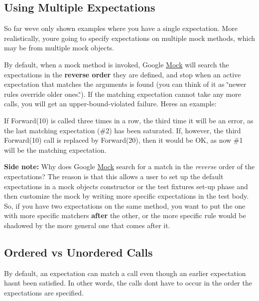 \subsection*{Using Multiple Expectations}

So far we\textquotesingle{}ve only shown examples where you have a single expectation. More realistically, you\textquotesingle{}re going to specify expectations on multiple mock methods, which may be from multiple mock objects.

By default, when a mock method is invoked, Google \hyperlink{classMock}{Mock} will search the expectations in the {\bfseries reverse order} they are defined, and stop when an active expectation that matches the arguments is found (you can think of it as \char`\"{}newer rules override older ones.\char`\"{}). If the matching expectation cannot take any more calls, you will get an upper-\/bound-\/violated failure. Here\textquotesingle{}s an example\+:




If {\ttfamily Forward(10)} is called three times in a row, the third time it will be an error, as the last matching expectation (\#2) has been saturated. If, however, the third {\ttfamily Forward(10)} call is replaced by {\ttfamily Forward(20)}, then it would be OK, as now \#1 will be the matching expectation.

{\bfseries Side note\+:} Why does Google \hyperlink{classMock}{Mock} search for a match in the {\itshape reverse} order of the expectations? The reason is that this allows a user to set up the default expectations in a mock object\textquotesingle{}s constructor or the test fixture\textquotesingle{}s set-\/up phase and then customize the mock by writing more specific expectations in the test body. So, if you have two expectations on the same method, you want to put the one with more specific matchers {\bfseries after} the other, or the more specific rule would be shadowed by the more general one that comes after it.

\subsection*{Ordered vs Unordered Calls}

By default, an expectation can match a call even though an earlier expectation hasn\textquotesingle{}t been satisfied. In other words, the calls don\textquotesingle{}t have to occur in the order the expectations are specified.

